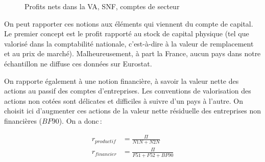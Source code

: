 \documentclass[
  french,
  9pt,
  a4paper,
]{article}
\begin{document}
\begin{figure}[H]

\caption{\label{fig-profits}Profits nets dans la VA, SNF, comptes de
secteur}


\end{figure}%

On peut rapporter ces notions aux éléments qui viennent du compte de
capital. Le premier concept est le profit rapporté au stock de capital
physique (tel que valorisé dans la comptabilité nationale, c'est-à-dire
à la valeur de remplacement et au prix de marché). Malheureusement, à
part la France, aucun pays dans notre échantillon ne diffuse ces données
sur Eurostat.

On rapporte également à une notion financière, à savoir la valeur nette
des actions au passif des comptes d'entreprises. Les conventions de
valorisation des actions non cotées sont délicates et difficiles à
suivre d'un pays à l'autre. On choisit ici d'augmenter ces actions de la
valeur nette résiduelle des entreprises non financières (\(BF90\)). On a
donc\,:

\[
\begin{aligned}
r_{productif} & = \frac{\Pi}{N1N+N2N} \\
r_{financier} & = \frac{\Pi}{F51+F52+BF90}
\end{aligned}
\]
\end{document}
